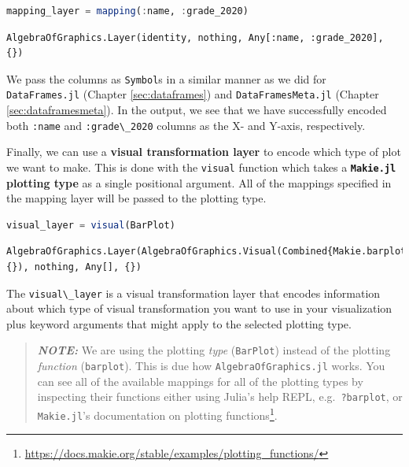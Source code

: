 \documentclass[
  notoc %
]{tufte-book}
\DeclareRobustCommand{\href}[2]{#2\footnote{\url{#1}}}
\newcommand{\passthrough}[1]{#1}
\begin{document}
\begin{lstlisting}[language=Julia]
mapping_layer = mapping(:name, :grade_2020)
\end{lstlisting}

\begin{lstlisting}[language=Output]
AlgebraOfGraphics.Layer(identity, nothing, Any[:name, :grade_2020], {})
\end{lstlisting}

We pass the columns as \passthrough{\lstinline!Symbol!}s in a similar
manner as we did for \passthrough{\lstinline!DataFrames.jl!} (Chapter
\ref{sec:dataframes}) and \passthrough{\lstinline!DataFramesMeta.jl!}
(Chapter \ref{sec:dataframesmeta}). In the output, we see that we have
successfully encoded both \passthrough{\lstinline!:name!} and
\passthrough{\lstinline!:grade\_2020!} columns as the X- and Y-axis,
respectively.

Finally, we can use a \textbf{visual transformation layer} to encode
which type of plot we want to make. This is done with the
\passthrough{\lstinline!visual!} function which takes a
\textbf{\passthrough{\lstinline!Makie.jl!} plotting type} as a single
positional argument. All of the mappings specified in the mapping layer
will be passed to the plotting type.

\begin{lstlisting}[language=Julia]
visual_layer = visual(BarPlot)
\end{lstlisting}

\begin{lstlisting}[language=Output]
AlgebraOfGraphics.Layer(AlgebraOfGraphics.Visual(Combined{Makie.barplot}, {}), nothing, Any[], {})
\end{lstlisting}

The \passthrough{\lstinline!visual\_layer!} is a visual transformation
layer that encodes information about which type of visual transformation
you want to use in your visualization plus keyword arguments that might
apply to the selected plotting type.

\begin{quote}
\textbf{\emph{NOTE:}} We are using the plotting \emph{type}
(\passthrough{\lstinline!BarPlot!}) instead of the plotting
\emph{function} (\passthrough{\lstinline!barplot!}). This is due how
\passthrough{\lstinline!AlgebraOfGraphics.jl!} works. You can see all of
the available mappings for all of the plotting types by inspecting their
functions either using Julia's help REPL,
e.g.~\passthrough{\lstinline!?barplot!}, or
\href{https://docs.makie.org/stable/examples/plotting_functions/}{\passthrough{\lstinline!Makie.jl!}'s
documentation on plotting functions}.
\end{quote}
\end{document}
